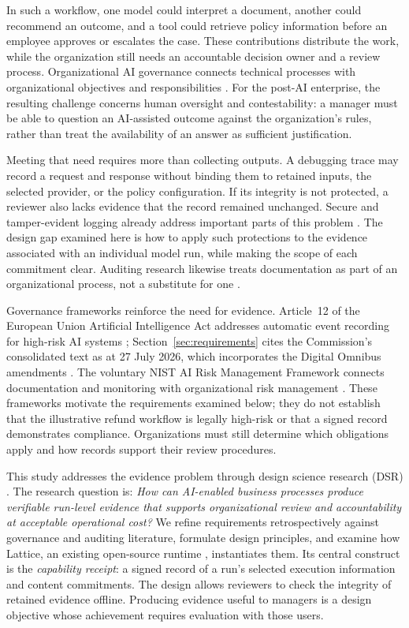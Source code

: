 \documentclass[11pt]{article}
\begin{document}
In such a workflow, one model could interpret a document, another could recommend an outcome, and a tool could retrieve policy information before an employee approves or escalates the case. These contributions distribute the work, while the organization still needs an accountable decision owner and a review process. Organizational AI governance connects technical processes with organizational objectives and responsibilities \citep{mantymaki2022}. For the post-AI enterprise, the resulting challenge concerns human oversight and contestability: a manager must be able to question an AI-assisted outcome against the organization's rules, rather than treat the availability of an answer as sufficient justification.

Meeting that need requires more than collecting outputs. A debugging trace may record a request and response without binding them to retained inputs, the selected provider, or the policy configuration. If its integrity is not protected, a reviewer also lacks evidence that the record remained unchanged. Secure and tamper-evident logging already address important parts of this problem \citep{crosby2009}. The design gap examined here is how to apply such protections to the evidence associated with an individual model run, while making the scope of each commitment clear. Auditing research likewise treats documentation as part of an organizational process, not a substitute for one \citep{raji2020}.

Governance frameworks reinforce the need for evidence. Article~12 of the European Union Artificial Intelligence Act addresses automatic event recording for high-risk AI systems \citep{euaiact2024}; Section~\ref{sec:requirements} cites the Commission's consolidated text as at 27 July 2026, which incorporates the Digital Omnibus amendments \citep{euai2026text}. The voluntary NIST AI Risk Management Framework connects documentation and monitoring with organizational risk management \citep{nist2023}. These frameworks motivate the requirements examined below; they do not establish that the illustrative refund workflow is legally high-risk or that a signed record demonstrates compliance. Organizations must still determine which obligations apply and how records support their review procedures.

This study addresses the evidence problem through design science research (DSR) \citep{hevner2004}. The research question is: \emph{How can AI-enabled business processes produce verifiable run-level evidence that supports organizational review and accountability at acceptable operational cost?} We refine requirements retrospectively against governance and auditing literature, formulate design principles, and examine how Lattice, an existing open-source runtime \citep{lattice}, instantiates them. Its central construct is the \emph{capability receipt}: a signed record of a run's selected execution information and content commitments. The design allows reviewers to check the integrity of retained evidence offline. Producing evidence useful to managers is a design objective whose achievement requires evaluation with those users.
\end{document}
